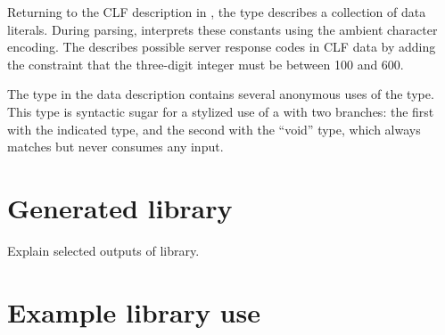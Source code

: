 Returning to the CLF description in , the  type  describes
a collection of data literals.  During parsing, \pads{} interprets these
constants using the ambient character encoding.  The  
 describes possible server response codes in CLF data by adding
the constraint that the three-digit integer must be between 100 and 600.

The  type in the \dibbler{} data description contains several
anonymous uses of the  type.  This type is syntactic sugar for a 
stylized use of a  with two branches: the first with the indicated type, and the second with the ``void'' type, which  
always matches but never consumes any input.



\section{Generated library}
\label{sec:example:generated-library}
Explain selected outputs of library.

\section{Example library use}
\label{sec:example:library-use}